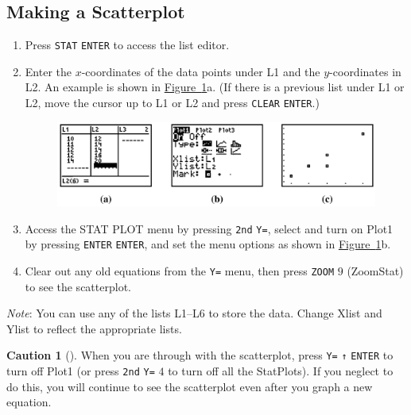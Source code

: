 \documentclass[10pt,]{book}
\theoremstyle{plain}
\theoremstyle{definition}
\newtheorem{warning}[theorem]{Caution}
\theoremstyle{definition}
\theoremstyle{definition}
\numberwithin{equation}{part}
\begin{document}
\subsection[{Making a Scatterplot}]{Making a Scatterplot}\label{scatterplot}
\leavevmode%
\begin{enumerate}[label=*\arabic**]
\item\hypertarget{li-441}{}Press \lstinline?STAT? \lstinline?ENTER? to access the list editor.%
\item\hypertarget{li-442}{}Enter the \(x\)-coordinates of the data points under L1 and the \(y\)-coordinates in L2. An example is shown in \hyperref[fig-GC-scatterplot]{Figure~\ref{fig-GC-scatterplot}}a. (If there is a previous list under L1 or L2, move the cursor up to L1 or L2 and press \lstinline?CLEAR? \lstinline?ENTER?.) \leavevmode%
\begin{figure}
\centering
\includegraphics[width=1\linewidth]{images/fig-GC-scatterplot.jpg}
\caption{\label{fig-GC-scatterplot}}
\end{figure}
%
\item\hypertarget{li-443}{}Access the STAT PLOT menu by pressing \lstinline?2nd? \lstinline?Y=?, select and turn on Plot1 by pressing \lstinline?ENTER? \lstinline?ENTER?, and set the menu options as shown in \hyperref[fig-GC-scatterplot]{Figure~\ref{fig-GC-scatterplot}}b.%
\item\hypertarget{li-444}{}Clear out any old equations from the \lstinline?Y=? menu, then press \lstinline?ZOOM? \(9\) (ZoomStat) to see the scatterplot.%
\end{enumerate}
 \emph{Note}: You can use any of the lists L1–L6 to store the data. Change Xlist and Ylist to reflect the appropriate lists.%
\begin{warning}[]\label{warning-17}
When you are through with the scatterplot, press \lstinline?Y=? \lstinline?↑? \lstinline?ENTER? to turn off Plot1 (or press \lstinline?2nd? \lstinline?Y=? \(4\) to turn off all the StatPlots). If you neglect to do this, you will continue to see the scatterplot even after you graph a new equation.%
\end{warning}
\typeout{************************************************}
\typeout{************************************************}
\end{document}
